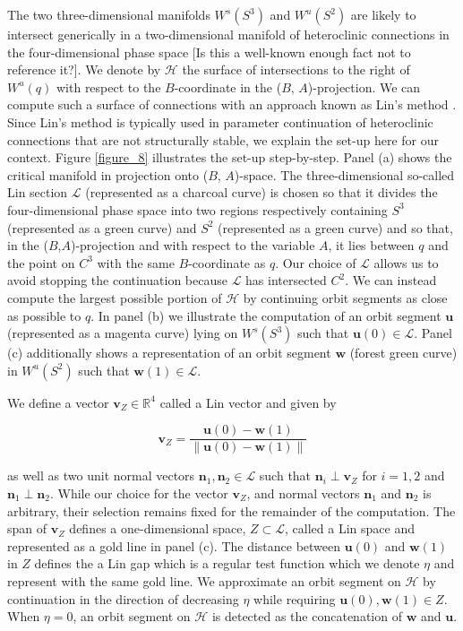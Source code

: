 \documentclass{ws-ijbc}
\begin{document}
The two three-dimensional manifolds $W^s(S^3)$ and $W^u(S^2)$ are likely to intersect generically in a two-dimensional manifold of heteroclinic connections in the four-dimensional phase space [Is this a well-known enough fact not to reference it?].  We denote by $\mathscr{H}$ the surface of intersections to the right of $W^u(q)$ with respect to the $B$-coordinate in the ($B$, $A$)-projection.  We can compute such a surface of connections with an approach known as Lin's method \cite{Lin_original, Lin_POs, Lin_POs2}.  Since Lin's method is typically used in parameter continuation of heteroclinic connections that are not structurally stable, we explain the set-up here for our context.  Figure \ref{figure_8} illustrates the set-up step-by-step.  Panel (a) shows the critical manifold in projection onto ($B$, $A$)-space.  The three-dimensional so-called Lin section $\mathscr{L}$ (represented as a charcoal curve) is chosen so that it divides the four-dimensional phase space into two regions respectively containing $S^3$ (represented as a green curve) and $S^2$ (represented as a green curve) and so that, in the ($B$,$A$)-projection and with respect to the variable $A$, it lies between $q$ and the point on $C^3$ with the same $B$-coordinate as $q$.  Our choice of $\mathscr{L}$ allows us to avoid stopping the continuation because $\mathscr{L}$ has intersected $C^2$.  We can instead compute the largest possible portion of $\mathscr{H}$ by continuing orbit segments as close as possible to $q$.  In panel (b) we illustrate the computation of an orbit segment $\mathbf{u}$ (represented as a magenta curve) lying on $W^s(S^3)$ such that $\mathbf{u}(0) \in \mathscr{L}$.  Panel (c) additionally shows a representation of an orbit segment $\mathbf{w}$ (forest green curve) in $W^u(S^2)$ such that  $\mathbf{w}(1) \in \mathscr{L}$.

We define a vector $\mathbf{v}_Z \in \mathbb{R}^4$ called a Lin vector and given by 

	\begin{equation}
		\mathbf{v}_Z = \frac{\mathbf{u}(0) - \mathbf{w}(1)}{\left\lVert \mathbf{u}(0) - \mathbf{w}(1) \right\lVert}
		\label{Lin_vector}
	\end{equation}
	
\noindent	
as well as two unit normal vectors $\mathbf{n}_1, \mathbf{n}_2 \in \mathscr{L}$ such that $\mathbf{n}_i \perp \mathbf{v}_Z$ for $i=1,2$ and $\mathbf{n}_1 \perp \mathbf{n}_2$.  While our choice for the vector $\mathbf{v}_Z$, and normal vectors $\mathbf{n}_1$ and $\mathbf{n}_2$ is arbitrary, their selection remains fixed for the remainder of the computation.  The span of $\mathbf{v}_Z$ defines a one-dimensional space, $Z \subset \mathscr{L}$, called a Lin space and represented as a gold line in panel (c).  The distance between $\mathbf{u}(0)$ and $\mathbf{w}(1)$ in $Z$ defines the a Lin gap which is a regular test function which we denote $\eta$ and represent with the same gold line.  We approximate an orbit segment on $\mathscr{H}$ by continuation in the direction of decreasing $\eta$ while requiring $\mathbf{u}(0), \mathbf{w}(1) \in Z$.  When  $\eta = 0$, an orbit segment on $\mathscr{H}$ is detected as the concatenation of $\mathbf{w}$ and $\mathbf{u}$.
\end{document}
